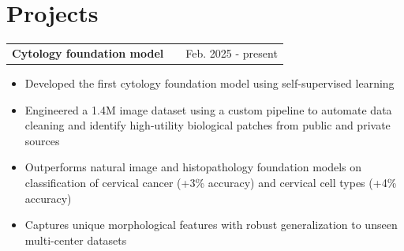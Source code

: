 \documentclass[a4paper,12pt]{article}
\makeatletter
\newenvironment{joblong}[3]
    {
    \begin{tabularx}{\linewidth}{@{}l X r@{}}
    \textbf{#1} & \hfill &  #2 \\
    \textit{#3} & & \\[3.75pt]  
    \end{tabularx}
    \begin{minipage}[t]{\linewidth}
    \begin{itemize}[nosep,after=\strut, leftmargin=1em, itemsep=2.5pt,label=\scriptsize$\bullet$]
    }
    {
    \end{itemize}
    \end{minipage}    
    }
\newenvironment{projectlong}[2]
    {
    \vspace{-0.3em}
    \begin{tabularx}{\linewidth}{@{}l X r@{}}
    \textbf{#1} & \hfill &  #2 \\
    \end{tabularx}
    \begin{minipage}[t]{\linewidth}
    \begin{itemize}[nosep,after=\strut, leftmargin=1em, itemsep=2.5pt,label=\scriptsize$\bullet$]
    }
    {
    \end{itemize}
    \end{minipage}
    \vspace{-0.3em}
    }
\makeatother
\begin{document}



\section{Projects}


\begin{projectlong}{Cytology foundation model}{Feb. 2025 - present}
    \item Developed the first cytology foundation model using self-supervised learning 
    \item Engineered a 1.4M image dataset using a custom pipeline to automate data cleaning and identify high-utility biological patches from public and private sources
    \item Outperforms natural image and histopathology foundation models on classification of cervical cancer (+3\% accuracy) and cervical cell types (+4\% accuracy)
    \item Captures unique morphological features with robust generalization to unseen multi-center datasets

\end{projectlong}
\end{document}
